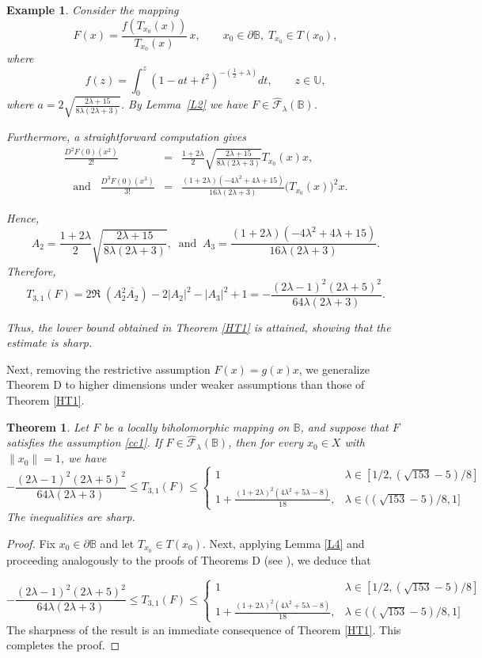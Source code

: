 \documentclass[11pt, reqno]{amsart}
\newtheorem{theo}{Theorem}[section]
\newtheorem{exm}{Example}[section]
\numberwithin{equation}{section}
\newcommand{\beas}{\begin{eqnarray*}}
\newcommand{\eeas}{\end{eqnarray*}}
\begin{document}
\begin{exm}
Consider the mapping
\[
F(x)=
\frac{f\!\left(T_{x_0}(x)\right)}{T_{x_0}(x)}\,x,
\qquad
x_0\in\partial\mathbb{B},\;
T_{x_0}\in T(x_0),
\]
where
\[
f(z)=\int_{0}^z(1-at+t^2)^{-\left(\frac{1}{2}+\lambda\right)}dt, 
\qquad z\in\mathbb{U},
\]
where $a=2\sqrt{\frac{2\lambda+15}{8\lambda(2\lambda+3)}}$. 
By Lemma~\ref{L2} we have $F\in \widehat{\mathcal{F}}_{\lambda}(\mathbb{B})$. 


Furthermore, a straightforward computation gives
\beas
\frac{D^2F(0)(x^2)}{2!}&=&\frac{1+2\lambda}{2}\sqrt{\frac{2\lambda+15}{8\lambda(2\lambda+3)}}T_{x_0}(x)x,\\
\;\;\;\text{and}\;\;\;\frac{D^3F(0)(x^3)}{3!}
&=&\frac{(1+2\lambda)(-4\lambda^2+4\lambda+15)}{16\lambda(2\lambda+3)}\bigl(T_{x_0}(x)\bigr)^2x.
\eeas

Hence,
\[
A_2=\frac{1+2\lambda}{2}\sqrt{\frac{2\lambda+15}{8\lambda(2\lambda+3)}},\;\;
\text{and}\;\;A_3=\frac{(1+2\lambda)(-4\lambda^2+4\lambda+15)}{16\lambda(2\lambda+3)}.
\]
Therefore,
\[
T_{3,1}(F)
=2\Re\;(A_2^2\overline{A_2})-2|A_2|^2-|A_3|^2+1
=-\frac{(2\lambda-1)^2(2\lambda+5)^2}{64\lambda(2\lambda+3)}.\]

Thus, the lower bound obtained in Theorem \ref{HT1} is attained, showing that the estimate is sharp.
\end{exm}

Next, removing the restrictive assumption $F(x)=g(x)x$, we generalize Theorem D to higher dimensions under weaker assumptions than those of Theorem \ref{HT1}. 
\begin{theo}\label{HT2}
Let $F$ be a locally biholomorphic mapping on $\mathbb{B}$, and suppose that $F$ satisfies the assumption \eqref{cc1}. If $F\in \widehat{\mathcal{F}}_{\lambda}(\mathbb{B})$, then for every $x_0\in X$ with $\|x_0\|=1$, we have
\[
-\frac{(2\lambda-1)^2(2\lambda+5)^2}{64\lambda(2\lambda+3)}\leq T_{3,1}(F)\leq  \begin{cases} 1 &\lambda\in [1/2, (\sqrt{153}-5)/8]\\
1+\frac{(1+2\lambda)^2(4\lambda^2+5\lambda-8)}{18}, &\lambda\in ((\sqrt{153}-5)/8,1]
\end{cases}
\]
 The inequalities are sharp.
\end{theo}
\begin{proof} Fix $x_0\in \partial{\mathbb{B}}$ and let $T_{x_0}\in T(x_0)$. Next, applying Lemma \ref{L4} and proceeding analogously to the proofs of Theorems D (see \cite[Theorem 5.1]{ALT2022}), we deduce that

\[
-\frac{(2\lambda-1)^2(2\lambda+5)^2}{64\lambda(2\lambda+3)}\leq T_{3,1}(F)\leq  \begin{cases} 1 &\lambda\in [1/2, (\sqrt{153}-5)/8]\\
1+\frac{(1+2\lambda)^2(4\lambda^2+5\lambda-8)}{18}, &\lambda\in ((\sqrt{153}-5)/8,1]
\end{cases}
\]
 The sharpness of the result is an immediate consequence of Theorem \ref{HT1}. This completes the proof.
\end{proof}
\end{document}
